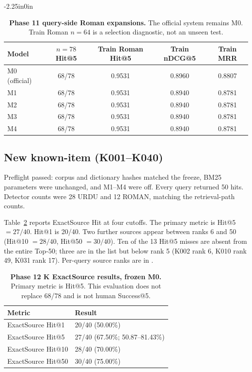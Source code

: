 \documentclass[10pt,letterpaper]{article}
\begin{document}
\begin{adjustwidth}{-2.25in}{0in}
\begin{table}[!ht]
\centering
\caption{\textbf{Phase 11 query-side Roman expansions.} The official system remains M0. Train Roman $n = 64$ is a selection diagnostic, not an unseen test.}
\begin{tabular}{|l|c|c|c|c|}
\hline
\textbf{Model} & \textbf{$n = 78$ Hit@5} & \textbf{Train Roman Hit@5} & \textbf{Train nDCG@5} & \textbf{Train MRR} \\
\hline
M0 (official) & 68/78 & 0.9531 & 0.8960 & 0.8807 \\
\hline
M1 & 68/78 & 0.9531 & 0.8940 & 0.8781 \\
\hline
M2 & 68/78 & 0.9531 & 0.8940 & 0.8781 \\
\hline
M3 & 68/78 & 0.9531 & 0.8940 & 0.8781 \\
\hline
M4 & 68/78 & 0.9531 & 0.8940 & 0.8781 \\
\hline
\end{tabular}
\label{table3}
\end{table}
\end{adjustwidth}

\subsection*{New known-item (K001--K040)}

Preflight passed: corpus and dictionary hashes matched the freeze, BM25 parameters were unchanged, and M1--M4 were off. Every query returned 50 hits. Detector counts were 28 URDU and 12 ROMAN, matching the retrieval-path counts.

Table~\ref{table4} reports ExactSource Hit at four cutoffs. The primary metric is Hit@5 $= 27/40$. Hit@1 is 20/40. Two further sources appear between ranks 6 and 50 (Hit@10 $= 28/40$, Hit@50 $= 30/40$). Ten of the 13 Hit@5 misses are absent from the entire Top-50; three are in the list but below rank 5 (K002 rank 6, K010 rank 49, K031 rank 17). Per-query source ranks are in .

\begin{table}[!ht]
\centering
\caption{\textbf{Phase 12 K ExactSource results, frozen M0.} Primary metric is Hit@5. This evaluation does not replace 68/78 and is not human Success@5.}
\begin{tabular}{|l|l|}
\hline
\textbf{Metric} & \textbf{Result} \\
\hline
ExactSource Hit@1 & 20/40 (50.00\%) \\
\hline
ExactSource Hit@5 & 27/40 (67.50\%; 50.87--81.43\%) \\
\hline
ExactSource Hit@10 & 28/40 (70.00\%) \\
\hline
ExactSource Hit@50 & 30/40 (75.00\%) \\
\hline
\end{tabular}
\label{table4}
\end{table}
\end{document}
